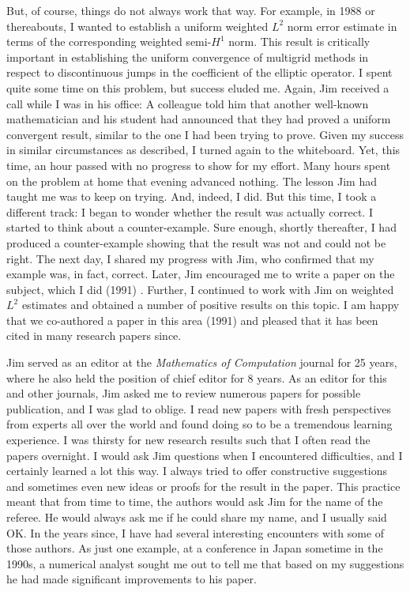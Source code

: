 \documentclass[CJK,11pt]{amsart}
\theoremstyle{definition}
\begin{document}
\begin{CJK*}{UTF8}{gbsn}
But, of course, things do not always work that way. For example, in 1988 or thereabouts, I wanted to establish a uniform weighted $L^2$ norm error estimate in terms of the corresponding weighted semi-$H^1$ norm. This result is critically important in establishing the uniform convergence of multigrid methods in respect to discontinuous jumps in the coefficient of the elliptic operator. I spent quite some time on this problem, but success eluded me. Again, Jim received a call while I was in his office: A colleague told him that another well-known mathematician and his student had announced that they had proved a uniform convergent result, similar to the one I had been trying to prove. Given my success in similar circumstances as described, I turned again to the whiteboard. Yet, this time, an hour passed with no progress to show for my effort. Many hours spent on the problem at home that evening advanced nothing. The lesson Jim had taught me was to keep on trying. And, indeed, I did. But this time, I took a different track: I began to wonder whether the result was actually correct. I started to think about a counter-example. Sure enough, shortly thereafter, I had produced a counter-example showing that the result was not and could not be right. The next day, I shared my progress with Jim, who confirmed that my example was, in fact, correct. Later, Jim encouraged me to write a paper on the subject, which I did (1991) \cite{xu1991counterexamples}. Further, I continued to work with Jim on weighted $L^2$ estimates and obtained a number of positive results on this topic. I am happy that we co-authored a paper in this area (1991) \cite{bramble1991some} and pleased that it has been cited in many research papers since. 

Jim served as an editor at the {\it Mathematics of Computation} journal for 25 years, where he also held the position of chief editor for 8 years. As an editor for this and other journals, Jim asked me to review numerous papers for possible publication, and I was glad to oblige. I read new papers with fresh perspectives from experts all over the world and found doing so to be a tremendous learning experience. I was thirsty for new research results such that I often read the papers overnight. I would ask Jim questions when I encountered difficulties, and I certainly learned a lot this way. I always tried to offer constructive suggestions and sometimes even new ideas or proofs for the result in the paper. This practice meant that from time to time, the authors would ask Jim for the name of the referee. He would always ask me if he could share my name, and I usually said OK. In the years since, I have had several interesting encounters with some of those authors. As just one example, at a conference in Japan sometime in the 1990s, a numerical analyst sought me out to tell me that based on my suggestions he had made significant improvements to his paper. 


\end{CJK*}
\end{document}
